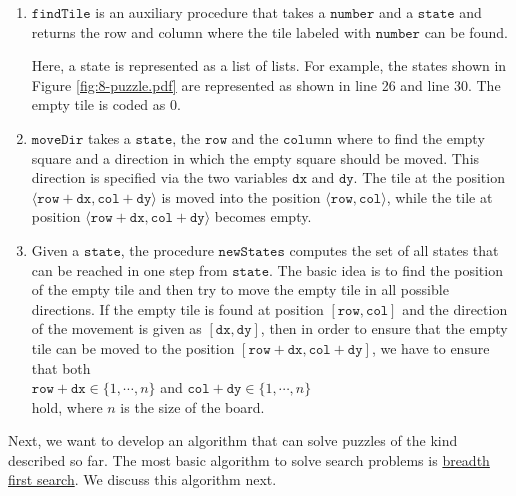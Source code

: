 \begin{enumerate}
\item $\mathtt{findTile}$ is an auxiliary procedure that takes a $\mathtt{number}$ and a $\mathtt{state}$ and
      returns the row and column where the tile labeled with $\mathtt{number}$ can be found.  

      Here, a state is represented as a list of lists.  For example, the states shown in Figure
      \ref{fig:8-puzzle.pdf} are represented as shown in line 26 and line 30.  The empty tile is
      coded as $0$. 
\item $\mathtt{moveDir}$ takes a $\mathtt{state}$, the $\mathtt{row}$ and the $\mathtt{col}$umn
      where to find the empty square and a direction in which the empty square should be moved.
      This direction is specified via the two variables $\mathtt{dx}$ and $\mathtt{dy}$.  The tile
      at the position $\langle\mathtt{row} + \mathtt{dx}, \mathtt{col} + \mathtt{dy}\rangle$ is
      moved into the position $\langle\mathtt{row}, \mathtt{col}\rangle$, while the tile at position
      $\langle\mathtt{row} + \mathtt{dx}, \mathtt{col} + \mathtt{dy}\rangle$ becomes empty.
\item Given a $\mathtt{state}$, the procedure $\mathtt{newStates}$ computes the set of all states
      that can be reached in one step from $\mathtt{state}$.  The basic idea is to find the position of the
      empty tile and then try to move the empty tile in all possible directions.  If the empty tile is found at
      position $[\mathtt{row}, \mathtt{col}]$ and the direction of the movement is given as $[\mathtt{dx}, \mathtt{dy}]$, then
      in order to ensure that the empty tile can be moved to the position $[\mathtt{row}+\mathtt{dx}, \mathtt{col}+\mathtt{dy}]$,
      we have to ensure that both
      \\[0.2cm]
      \hspace*{1.3cm}
      $\mathtt{row}+\mathtt{dx} \in \{1,\cdots,n\}$ \quad and \quad
      $\mathtt{col}+\mathtt{dy} \in \{1,\cdots,n\}$
      \\[0.2cm]
      hold, where $n$ is the size of the board.
\end{enumerate}

Next, we want to develop an algorithm that can solve puzzles of the kind described so far.  The most basic
algorithm to solve search problems is \href{https://en.wikipedia.org/wiki/Breadth-first_search}{breadth first search}. 
We discuss this algorithm next.

